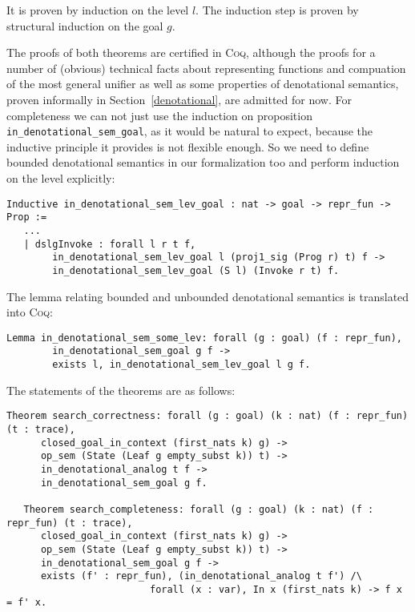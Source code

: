 It is proven by induction on the level $l$. The induction step is proven by structural induction on the goal $g$.

The proofs of both theorems are certified in \textsc{Coq}, although the proofs for a number of (obvious) technical facts about representing functions and compuation of the most
general unifier as well as some properties of denotational semantics, proven informally in Section~\ref{denotational}, are
admitted for now. For completeness we can not just use the induction on proposition \lstinline|in_denotational_sem_goal|, as it would be natural to expect,
because the inductive principle it provides is not flexible enough. So we need to define bounded denotational semantics in our formalization too and perform
induction on the level explicitly:

\begin{lstlisting}[language=Coq]
   Inductive in_denotational_sem_lev_goal : nat -> goal -> repr_fun -> Prop :=
   ...
   | dslgInvoke : forall l r t f,
        in_denotational_sem_lev_goal l (proj1_sig (Prog r) t) f ->
        in_denotational_sem_lev_goal (S l) (Invoke r t) f.
\end{lstlisting}

The lemma relating bounded and unbounded denotational semantics is translated into \textsc{Coq}:

\begin{lstlisting}[language=Coq]
   Lemma in_denotational_sem_some_lev: forall (g : goal) (f : repr_fun),
        in_denotational_sem_goal g f ->
        exists l, in_denotational_sem_lev_goal l g f.
\end{lstlisting}

The statements of the theorems are as follows:

\begin{lstlisting}[language=Coq]
   Theorem search_correctness: forall (g : goal) (k : nat) (f : repr_fun) (t : trace),
      closed_goal_in_context (first_nats k) g) ->
      op_sem (State (Leaf g empty_subst k)) t) ->
      in_denotational_analog t f ->
      in_denotational_sem_goal g f.
      
   Theorem search_completeness: forall (g : goal) (k : nat) (f : repr_fun) (t : trace),
      closed_goal_in_context (first_nats k) g) ->
      op_sem (State (Leaf g empty_subst k)) t) ->
      in_denotational_sem_goal g f ->
      exists (f' : repr_fun), (in_denotational_analog t f') /\
                         forall (x : var), In x (first_nats k) -> f x = f' x.
\end{lstlisting}

